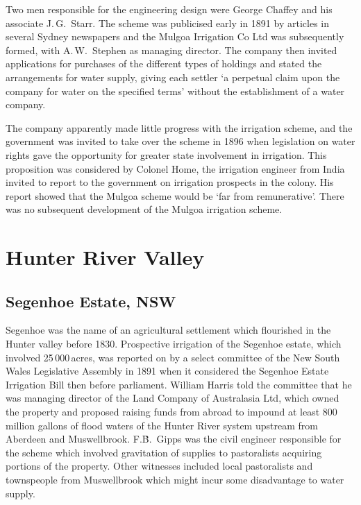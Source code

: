 Two men responsible for the engineering design were George Chaffey and
his associate J.\,G.~Starr.  The scheme was
publicised early in 1891 by articles in several Sydney newspapers and
the Mulgoa Irrigation Co Ltd was subsequently formed, with
A.\,W.~Stephen  as managing director.  The
company then invited applications for purchases of the different types
of holdings and stated the arrangements for water supply, giving each
settler `a perpetual claim upon the company for water on the specified
terms' without the establishment of a water company.

The company apparently made little progress with the irrigation
sch\-eme, and the government was invited to take over the scheme in
1896 when legislation on water rights gave the opportunity for greater
state involvement in irrigation.  This proposition was considered by
Colonel Home,  the irrigation engineer from India
invited to report to the government on irrigation prospects in the
colony.  His report showed that the Mulgoa scheme would be `far from
remunerative'.  There was no subsequent development of the Mulgoa
irrigation scheme.

\section*{Hunter River Valley}

\subsection*{Segenhoe Estate, NSW}

Segenhoe was the name of an agricultural settlement which flourished
in the Hunter valley before 1830.  Prospective irrigation of the
Segenhoe estate, which involved 25\,000\,acres, was reported on by a
select committee of the New South Wales Legislative Assembly in 1891
when it considered the Segenhoe Estate Irrigation Bill then before
parliament.  William Harris told the committee that he was managing
director of the Land Company of Australasia Ltd, which owned the
property and proposed raising funds from abroad to impound at least
800 million gallons of flood waters of the Hunter River system
upstream from Aberdeen and Muswellbrook.  F.\.B.~Gipps  was the civil engineer responsible for the scheme which
involved gravitation of supplies to pastoralists acquiring portions of
the property.  Other witnesses included local pastoralists and
townspeople from Muswellbrook which might incur some disadvantage to
water supply.

